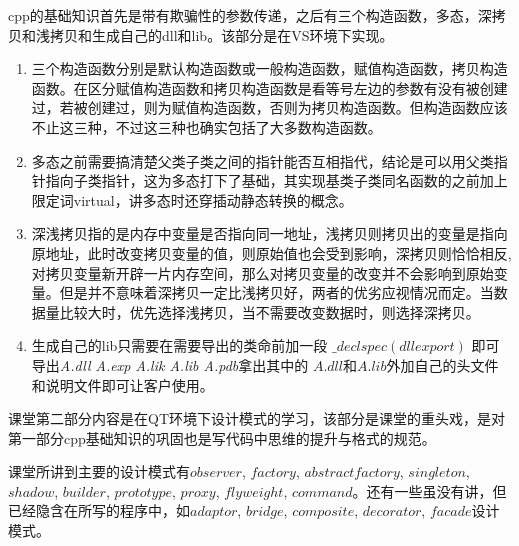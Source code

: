 \documentclass[a4paper,16pt,UTF8]{article}
\begin{document}
    cpp的基础知识首先是带有欺骗性的参数传递，之后有三个构造函数，多态，深拷贝和浅拷贝和生成自己的dll和lib。该部分是在VS环境下实现。
    
    \begin{enumerate}
        \item 三个构造函数分别是默认构造函数或一般构造函数，赋值构造函数，拷贝构造函数。在区分赋值构造函数和拷贝构造函数是看等号左边的参数有没有被创建过，若被创建过，则为赋值构造函数，否则为拷贝构造函数。但构造函数应该不止这三种，不过这三种也确实包括了大多数构造函数。

        \item 多态之前需要搞清楚父类子类之间的指针能否互相指代，结论是可以用父类指针指向子类指针，这为多态打下了基础，其实现基类子类同名函数的之前加上限定词virtual，讲多态时还穿插动静态转换的概念。
        
        \item 深浅拷贝指的是内存中变量是否指向同一地址，浅拷贝则拷贝出的变量是指向原地址，此时改变拷贝变量的值，则原始值也会受到影响，深拷贝则恰恰相反,对拷贝变量新开辟一片内存空间，那么对拷贝变量的改变并不会影响到原始变量。但是并不意味着深拷贝一定比浅拷贝好，两者的优劣应视情况而定。当数据量比较大时，优先选择浅拷贝，当不需要改变数据时，则选择深拷贝。

        \item 生成自己的lib只需要在需要导出的类命前加一段 \emph{$ \_declspec(dllexport)$} 即可导出\emph{A.dll A.exp A.lik A.lib A.pdb}拿出其中的 $A.dll$和$A.lib$外加自己的头文件和说明文件即可让客户使用。

    \end{enumerate}

    课堂第二部分内容是在QT环境下设计模式的学习，该部分是课堂的重头戏，是对第一部分cpp基础知识的巩固也是写代码中思维的提升与格式的规范。
    
    课堂所讲到主要的设计模式有$observer$, $factory$, $abstract factory$, $singleton$, $shadow$, $builder$, $prototype$, $proxy$, $flyweight$, $command$。还有一些虽没有讲，但已经隐含在所写的程序中，如$adaptor$, $bridge$, $composite$, $decorator$, $facade$设计模式。
\end{document}
